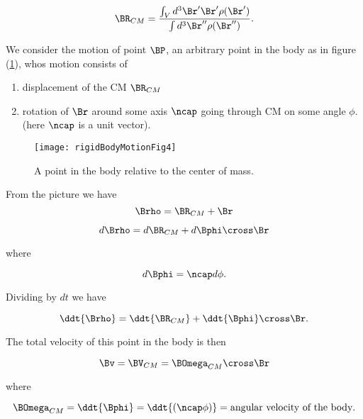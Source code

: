 \begin{equation}\label{eqn:rigidBodyMotion:80}
\BR_{CM} = \frac{\int_V d^3 \Br' \Br' \rho(\Br')}{ \int d^3 \Br'' \rho(\Br'')}.
\end{equation}

We consider the motion of point $\BP$, an arbitrary point in the body as in figure (\ref{fig:rigidBodyMotion:rigidBodyMotionFig4}), whos motion consists of

\begin{enumerate}
\item displacement of the CM $\BR_{CM}$
\item rotation of $\Br$ around some axis $\ncap$ going through CM on some angle $\phi$. (here $\ncap$ is a unit vector).
\end{enumerate}

\begin{figure}[htp]
   \centering
   \texttt{[image: rigidBodyMotionFig4]}
   \caption{A point in the body relative to the center of mass.}\label{fig:rigidBodyMotion:rigidBodyMotionFig4}
\end{figure}

From the picture we have
\begin{equation}\label{eqn:rigidBodyMotion:100}
\Brho = \BR_{CM} + \Br
\end{equation}

\begin{equation}\label{eqn:rigidBodyMotion:120}
d\Brho = d\BR_{CM} + d\Bphi \cross \Br
\end{equation}

where

\begin{equation}\label{eqn:rigidBodyMotion:140}
d\Bphi = \ncap d\phi.
\end{equation}

Dividing by $dt$ we have

\begin{equation}\label{eqn:rigidBodyMotion:160}
\ddt{\Brho} = \ddt{\BR_{CM}} + \ddt{\Bphi} \cross \Br.
\end{equation}

The total velocity of this point in the body is then

\begin{equation}\label{eqn:rigidBodyMotion:180}
\Bv = \BV_{CM} = \BOmega_{CM} \cross \Br
\end{equation}

where

\begin{equation}\label{eqn:rigidBodyMotion:200}
\BOmega_{CM} = \ddt{\Bphi} = \ddt{(\ncap \phi)} = \text{angular velocity of the body}.
\end{equation}


